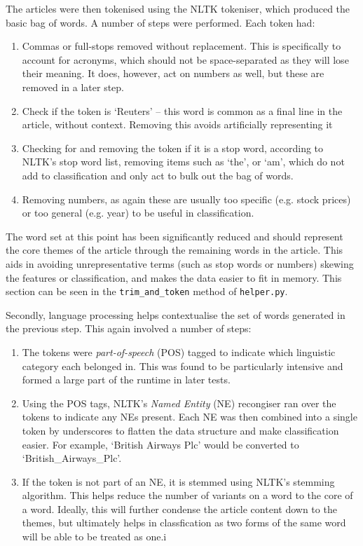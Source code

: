 \documentclass[11pt]{article}
\begin{document}
The articles were then tokenised using the NLTK tokeniser, which produced the basic bag of words. A number of steps were performed. Each token had:
\begin{enumerate}
\item Commas or full-stops removed without replacement. This is specifically to account for acronyms, which should not be space-separated as they will lose their meaning. It does, however, act on numbers as well, but these are removed in a later step.
\item Check if the token is `Reuters' – this word is common as a final line in the article, without context. Removing this avoids artificially representing it
\item Checking for and removing the token if it is a stop word, according to NLTK’s stop word list, removing items such as `the', or `am', which do not add to classification and only act to bulk out the bag of words.
\item Removing numbers, as again these are usually too specific (e.g. stock prices) or too general (e.g. year) to be useful in classification.
\end{enumerate}

The word set at this point has been significantly reduced and should represent the core themes of the article through the remaining words in the article. This aids in avoiding unrepresentative terms (such as stop words or numbers) skewing the features or classification, and makes the data easier to fit in memory. This section can be seen in the \texttt{trim\_and\_token} method of \texttt{helper.py}.

Secondly, language processing helps contextualise the set of words generated in the previous step. This again involved a number of steps:
\begin{enumerate}
\item The tokens were \textit{part-of-speech} (POS) tagged to indicate which linguistic category each belonged in. This was found to be particularly intensive and formed a large part of the runtime in later tests.
\item Using the POS tags, NLTK's \textit{Named Entity} (NE) recongiser ran over the tokens to indicate any NEs present. Each NE was then combined into a single token by underscores to flatten the data structure and make classification easier. For example, `British Airways Plc' would be converted to `British\_Airways\_Plc'.
\item If the token is not part of an NE, it is stemmed using NLTK's stemming algorithm. This helps reduce the number of variants on a word to the core of a word. Ideally, this will further condense the article content down to the themes, but ultimately helps in classfication as two forms of the same word will be able to be treated as one.i
\end{enumerate}
\end{document}
